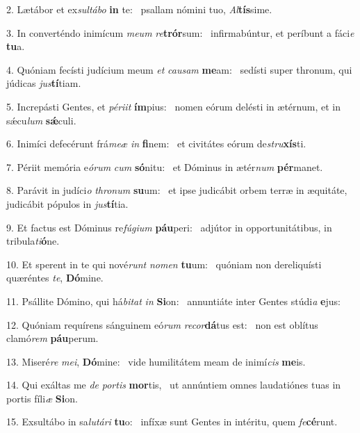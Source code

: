 2. Lætábor et ex\textit{sul}\textit{tá}\textit{bo} \textbf{in} te: \ast\  psallam nómini tuo, \textit{Al}\textbf{tís}sime.\

3. In converténdo inimícum \textit{me}\textit{um} \textit{re}\textbf{trór}sum: \ast\  infirmabúntur, et períbunt a fáci\textit{e} \textbf{tu}a.\

4. Quóniam fecísti judícium meum \textit{et} \textit{cau}\textit{sam} \textbf{me}am: \ast\  sedísti super thronum, qui júdicas \textit{jus}\textbf{tí}tiam.\

5. Increpásti Gentes, et \textit{pér}\textit{i}\textit{it} \textbf{ím}pius: \ast\  nomen eórum delésti in ætérnum, et in sǽcu\textit{lum} \textbf{sǽ}culi.\

6. Inimíci defecérunt frá\textit{me}\textit{æ} \textit{in} \textbf{fi}nem: \ast\  et civitátes eórum de\textit{stru}\textbf{xís}ti.\

7. Périit memória e\textit{ó}\textit{rum} \textit{cum} \textbf{só}nitu: \ast\  et Dóminus in ætér\textit{num} \textbf{pér}manet.\

8. Parávit in judíci\textit{o} \textit{thro}\textit{num} \textbf{su}um: \ast\  et ipse judicábit orbem terræ in æquitáte, judicábit pópulos in \textit{jus}\textbf{tí}tia.\

9. Et factus est Dóminus re\textit{fú}\textit{gi}\textit{um} \textbf{páu}peri: \ast\  adjútor in opportunitátibus, in tribula\textit{ti}\textbf{ó}ne.\

10. Et sperent in te qui nové\textit{runt} \textit{no}\textit{men} \textbf{tu}um: \ast\  quóniam non dereliquísti quæréntes \textit{te}, \textbf{Dó}mine.\

11. Psállite Dómino, qui há\textit{bi}\textit{tat} \textit{in} \textbf{Si}on: \ast\  annuntiáte inter Gentes stúdi\textit{a} \textbf{e}jus:\

12. Quóniam requírens sánguinem eó\textit{rum} \textit{re}\textit{cor}\textbf{dá}tus est: \ast\  non est oblítus clamó\textit{rem} \textbf{páu}perum.\

13. Miseré\textit{re} \textit{me}\textit{i}, \textbf{Dó}mine: \ast\  vide humilitátem meam de inimí\textit{cis} \textbf{me}is.\

14. Qui exáltas me \textit{de} \textit{por}\textit{tis} \textbf{mor}tis, \ast\  ut annúntiem omnes laudatiónes tuas in portis fíli\textit{æ} \textbf{Si}on.\

15. Exsultábo in sa\textit{lu}\textit{tá}\textit{ri} \textbf{tu}o: \ast\  infíxæ sunt Gentes in intéritu, quem \textit{fe}\textbf{cé}runt.\

